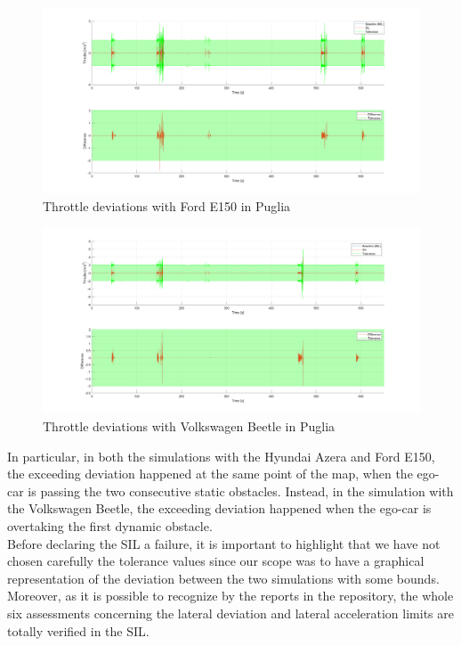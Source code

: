     \begin{figure}[H]
    \centering
    \includegraphics[width=1.1\textwidth,keepaspectratio]{Figures/throttle_ford.png}
    \caption{Throttle deviations with Ford E150 in Puglia}
    \label{fig:throttle_ford}
    \end{figure}%
    
    \begin{figure}[H]
    \centering
    \includegraphics[width=1.1\textwidth,keepaspectratio]{Figures/throttle_volkswagen.png}
    \caption{Throttle deviations with Volkswagen Beetle in Puglia}
    \label{fig:throttle_beetle}
    \end{figure}%
    
In particular, in both the simulations with the Hyundai Azera and Ford E150, the exceeding deviation happened at the same point of the map, when the ego-car is passing the two consecutive static obstacles. Instead, in the simulation with the Volkswagen Beetle, the exceeding deviation happened when the ego-car is overtaking the first dynamic obstacle.\\
Before declaring the SIL a failure, it is important to highlight that we have not chosen carefully the tolerance values since our scope was to have a graphical representation of the deviation between the two simulations with some bounds. Moreover, as it is possible to recognize by the reports in the repository, the whole six assessments concerning the lateral deviation and lateral acceleration limits are totally verified in the SIL.





